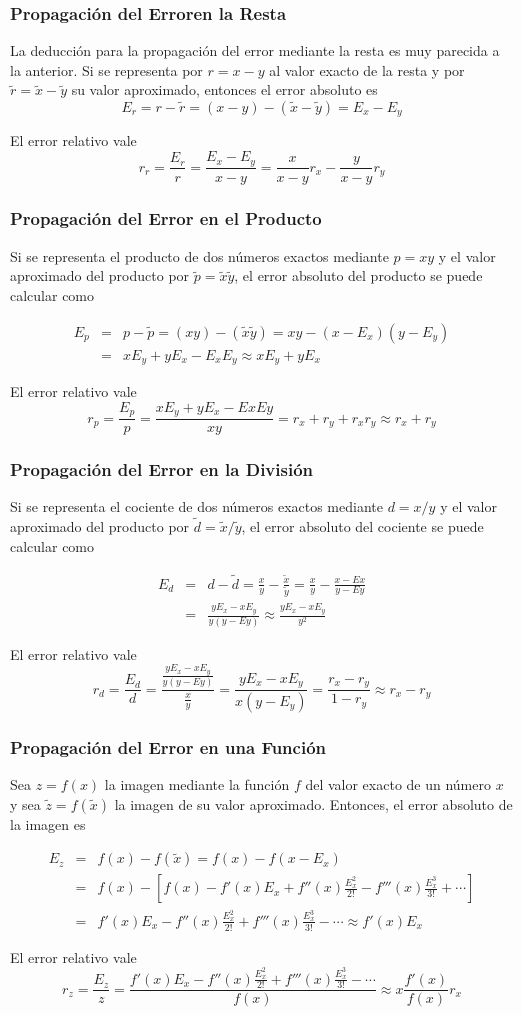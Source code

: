 \documentclass{beamer}
\begin{document}
\frame
{
\frametitle{Propagaci\'on del Erroren la Resta}

La deducci\'on para la propagaci\'on del error mediante la resta es muy parecida a la anterior. Si se representa por $r = x - y$ al valor exacto de la resta y por $\tilde r =\tilde x -\tilde y$ su valor aproximado, entonces el error absoluto es
$$
E_r = r -\tilde r = (x - y) - (\tilde x - \tilde y) = E_x - E_y
$$

El error relativo vale
$$
r_r = \frac{E_r}{r} = \frac{E_x-E_y}{x-y} = \frac{x}{x-y}r_x - \frac{y}{x-y}r_y
$$
}
\frame
{
\frametitle{Propagaci\'on del Error en el Producto}
Si se representa el producto de dos n\'umeros exactos mediante $p = xy$ y el valor aproximado del producto por $\tilde p = \tilde x\tilde y$, el error absoluto del producto se puede calcular como

\begin{eqnarray}
\nonumber E_p &=& p -\tilde p = (xy) - (\tilde x \tilde y) = xy - (x-E_x) (y- E_y)\\
\nonumber &=& x E_y + y E_x - E_x E_y \approx xE_y + yE_x
\end{eqnarray}


El error relativo vale
$$
r_p = \frac{E_p}{p} = \frac{xE_y+yE_x-ExEy}{xy} = r_x+r_y+r_xr_y \approx r_x+r_y
$$
}
\frame
{
\frametitle{Propagaci\'on del Error en la Divisi\'on}

Si se representa el cociente de dos n\'umeros exactos mediante $d = x/y$ y el valor aproximado del producto por $\tilde d = \tilde x/\tilde y$, el error absoluto del cociente se puede calcular como

\begin{eqnarray}
\nonumber E_d &=& d -\tilde d = \frac{x}{y} - \frac{\tilde x}{\tilde y} =\frac{x}{y} - \frac{x-Ex}{y-Ey}\\
\nonumber &=& \frac{yE_x-xE_y}{y(y-Ey)} \approx \frac{yE_x-xE_y}{y^2}
\end{eqnarray}


El error relativo vale
$$
r_d = \frac{E_d}{d} = \frac{\frac{yE_x-xE_y}{y(y-Ey)}}{\frac{x}{y}} = \frac{yE_x-xE_y}{x(y-E_y)} =  \frac{r_x-r_y}{1-r_y} \approx r_x-r_y
$$
}
\frame
{
\frametitle{Propagaci\'on del Error en una Funci\'on}

Sea $z = f(x)$ la imagen mediante la funci\'on $f$ del valor exacto de un n\'umero $x$ y sea $\tilde z = f(\tilde x)$ la imagen de su valor aproximado. Entonces, el error absoluto de la imagen es

\begin{eqnarray}
\nonumber E_z &=& f(x) -f(\tilde x) = f(x) - f(x-E_x)\\
\nonumber &=& f(x) - \left[f(x)-f'(x)E_x+f''(x)\frac{E_x^2}{2!}-f'''(x)\frac{E_x^3}{3!}+\cdots\right]\\
\nonumber &=& f'(x)E_x-f''(x)\frac{E_x^2}{2!}+f'''(x)\frac{E_x^3}{3!}-\cdots \approx f'(x)E_x
\end{eqnarray}

El error relativo vale
$$
r_z = \frac{E_z}{z} = \frac{f'(x)E_x-f''(x)\frac{E_x^2}{2!}+f'''(x)\frac{E_x^3}{3!}-\cdots}{f(x)}  \approx  x\frac{f'(x)}{f(x)}r_x 
$$
}
\end{document}
